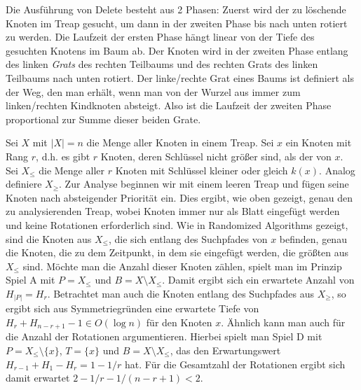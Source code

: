 \documentclass[a4paper]{scrreprt}
\theoremstyle{definition}
\begin{document}
Die Ausführung von Delete besteht aus 2 Phasen:
Zuerst wird der zu löschende Knoten im Treap gesucht, um dann in der zweiten Phase bis nach unten rotiert zu werden.
Die Laufzeit der ersten Phase hängt linear von der Tiefe des gesuchten Knotens im Baum ab.
Der Knoten wird in der zweiten Phase entlang des linken \emph{Grats} des rechten Teilbaums und des rechten Grats des linken Teilbaums nach unten rotiert.
Der linke/rechte Grat eines Baums ist definiert als der Weg, den man erhält, wenn man von der Wurzel aus immer zum linken/rechten Kindknoten absteigt.
Also ist die Laufzeit der zweiten Phase proportional zur Summe dieser beiden Grate.

Sei $X$ mit $\left|X\right| = n$ die Menge aller Knoten in einem Treap.
Sei $x$ ein Knoten mit Rang $r$, d.h. es gibt $r$ Knoten, deren Schlüssel nicht größer sind, als der von $x$.
Sei $X_\leq$ die Menge aller $r$ Knoten mit Schlüssel kleiner oder gleich $k(x)$.
Analog definiere $X_\geq$.
Zur Analyse beginnen wir mit einem leeren Treap und fügen seine Knoten nach absteigender Priorität ein.
Dies ergibt, wie oben gezeigt, genau den zu analysierenden Treap, wobei Knoten immer nur als Blatt eingefügt werden und keine Rotationen erforderlich sind.
Wie in Randomized Algorithms\cite{TODO} gezeigt, sind die Knoten aus $X_\leq$, die sich entlang des Suchpfades von $x$ befinden, genau die Knoten, die zu dem Zeitpunkt, in dem sie eingefügt werden, die größten aus $X_\leq$ sind.
Möchte man die Anzahl dieser Knoten zählen, spielt man im Prinzip Spiel A mit $P = X_\leq$ und $B = X \setminus X_\leq$.
Damit ergibt sich ein erwartete Anzahl von $H_{\left|P\right|} = H_r$.
Betrachtet man auch die Knoten entlang des Suchpfades aus $X_\geq$, so ergibt sich aus Symmetriegründen eine erwartete Tiefe von $H_r + H_{n-r+1} - 1 \in O(\log n)$ für den Knoten $x$.
Ähnlich kann man auch für die Anzahl der Rotationen argumentieren.
Hierbei spielt man Spiel D mit $P = X_\leq \setminus \{x\}$, $T = \{x\}$ und $B = X \setminus X_\leq$, das den Erwartungswert $H_{r-1} + H_1 - H_r = 1 - 1/r$ hat.
Für die Gesamtzahl der Rotationen ergibt sich damit erwartet $2 - 1/r - 1/(n-r+1) < 2$.
\end{document}
